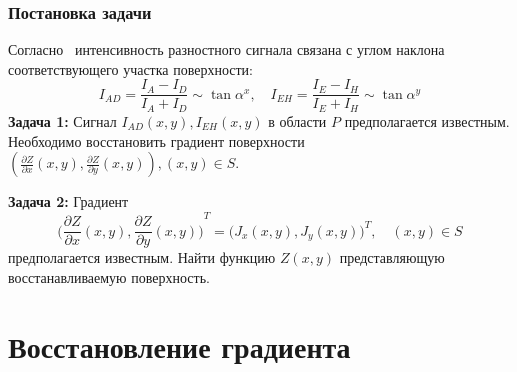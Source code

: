 \documentclass{beamer}
\begin{document}
\begin{frame}
    \frametitle{Постановка задачи}
    Согласно~\cite{PaluszynskiSlowko2005Vacuum, DrzazgaPaluszynski2005Measurement} интенсивность
    разностного сигнала связана с углом наклона соответствующего участка поверхности:
    \begin{equation*}
        I_{AD} = \frac{I_A - I_D}{I_A + I_D} \sim \tan{\alpha^x}, \quad
        I_{EH} = \frac{I_E - I_H}{I_E + I_H} \sim \tan{\alpha^y}
    \end{equation*}
    \textbf{Задача 1:} Сигнал $I_{AD}(x,y), I_{EH}(x,y)$ в области $P$ предполагается известным.
    Необходимо восстановить градиент поверхности
    $
        \left(\frac{\partial Z}{\partial x}(x,y), \frac{\partial Z}{\partial y} (x,y) \right),
        (x,y) \in S
    $.

    \vfill

    \textbf{Задача 2:} Градиент
    \begin{equation}
        {\Big(\frac{\partial Z}{\partial x}(x,y),
        \frac{\partial Z}{\partial y} (x,y)\Big)}^{T} =
        {\big(J_x(x,y), J_y(x,y)\big)}^T, \quad (x,y) \in S
        \label{eq:problem_statement}
    \end{equation}
    предполагается известным. Найти функцию $Z(x,y)$ представляющую восстанавливаемую поверхность.
\end{frame}


\section{Восстановление градиента}
\begin{frame}
    \sectionpage
\end{frame}
\end{document}
